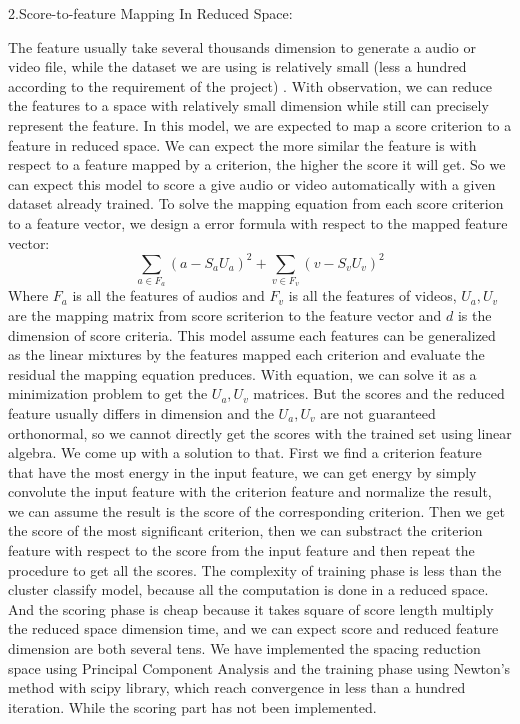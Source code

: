 \documentclass{report}
\begin{document}
2.Score-to-feature Mapping In Reduced Space:

The feature usually take several thousands dimension to generate a audio or video file, while the dataset we are using is relatively small (less a hundred according to the requirement of the project) . With observation, we can reduce the features to a space with relatively small dimension while still can precisely represent the feature.
In this model, we are expected to map a score criterion to a feature in reduced space. We can expect the more similar the feature is with respect to a feature mapped by a criterion, the higher the score it will get. So we can expect this model to score a give audio or video automatically with a given dataset already trained. 
To solve the mapping equation from each score criterion to a feature vector, we design a error formula with respect to the mapped feature vector:
$$\sum_{a\in F_a}(a - S_aU_a )^2 + \sum_{v\in F_v}(v - S_vU_v )^2 $$
Where $F_a$ is all the features of audios and $F_v$ is all the features of videos, $U_a, U_v$ are the mapping matrix from score scriterion to the feature vector and $d$ is the dimension of score criteria. This model assume each features can be generalized as the linear mixtures by the features mapped each criterion and evaluate the residual the mapping equation preduces. With equation, we can solve it as a minimization problem to get the $U_a, U_v$ matrices.
But the scores and the reduced feature usually differs in dimension and the $U_a, U_v$ are not guaranteed orthonormal, so we cannot directly get the scores with the trained set using linear algebra. We come up with a solution to that. First we find a criterion feature that have the most energy in the input feature, we can get energy by simply convolute the input feature with the criterion feature and normalize the result, we can assume the result is the score of the corresponding criterion. Then we get the score of the most significant criterion, then we can substract the criterion feature with respect to the score from the input feature and then repeat the procedure to get all the scores.
The complexity of training phase is less than the cluster classify model, because all the computation is done in a reduced space. And the scoring phase is cheap because it takes square of score length multiply the reduced space dimension time, and we can expect score and reduced feature dimension are both several tens.
We have implemented the spacing reduction space using Principal Component Analysis and the training phase using Newton’s method with scipy library, which reach convergence in less than a hundred iteration. While the scoring part has not been implemented.
\end{document}

